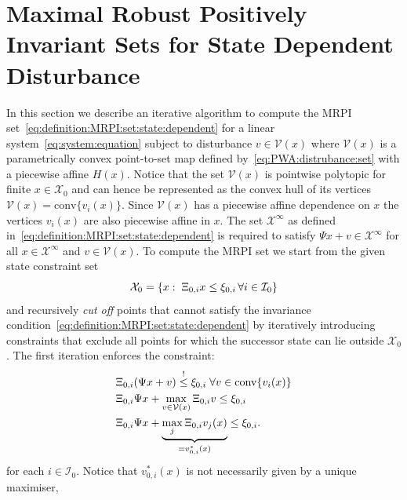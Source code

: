 \documentclass[letterpaper, 10pt, conference]{ieeeconf} %
\providecommand{\conv}{\text{conv}}
\begin{document}
\section{Maximal Robust Positively Invariant Sets for State Dependent Disturbance}\label{sec:state:dep:MRPI}
In this section we describe an iterative algorithm to compute the MRPI 
set~\eqref{eq:definition:MRPI:set:state:dependent} for a linear system~\eqref{eq:system:equation} subject to disturbance
$v\in\mathcal V(x)$ where $\mathcal V(x)$ is a parametrically convex point-to-set map defined by~\eqref{eq:PWA:distrubance:set} with a piecewise affine $H(x)$.
Notice that the set $\mathcal V(x)$ is pointwise polytopic 
for finite $x\in\mathcal X_0$ and can hence be represented as the 
convex hull of its vertices $\mathcal V(x) = \conv\{v_i(x)\}$. Since ${\mathcal{V}}(x)$
has a piecewise affine dependence on $x$ the vertices $v_i(x)$ are also piecewise affine in $x$.
The set $\mathcal X^\infty$ as defined in~\eqref{eq:definition:MRPI:set:state:dependent} 
is required to satisfy $\Psi x + v\in\mathcal X^\infty$ for all
$x\in\mathcal X^\infty$ and $v\in\mathcal V(x)$. To compute the MRPI set we start from the given 
state constraint set
\[
\mathcal X_0 = \{x:\;\Xi_{0,i}x\leq \xi_{0,i}\,\forall i\in\mathcal I_0\}
\]
and
recursively \emph{cut off} points that cannot satisfy the invariance condition~\eqref{eq:definition:MRPI:set:state:dependent}
by iteratively introducing
constraints that exclude all points for which the successor state can lie outside 
$\mathcal X_0$. The first iteration enforces the constraint:
%
\[%
\begin{split}
	&\genmat_{0,i}(\Psi x + v)\overset{!}{\leq}\genvec_{0,i}\;\forall v\in\conv\{v_i(x)\}\\
	&\genmat_{0,i}\Psi x + \max_{v\in\mathcal V(x)} \genmat_{0,i} v \leq \genvec_{0,i}\\
	&\genmat_{0,i}\Psi x + \underbrace{\max_{j} \genmat_{0,i} v_j(x)}_{=v_{0,i}^\ast(x)} \leq \genvec_{0,i}.
\end{split}
\]%
%
for each $i\in \mathcal I_0$.
Notice that $v_{0,i}^\ast(x)$ is not necessarily given by a unique maximiser, 
\end{document}
